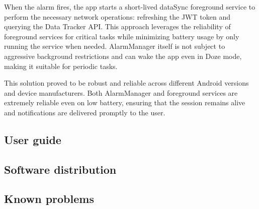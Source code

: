 When the alarm fires, the app starts a short-lived dataSync foreground service to perform the necessary network operations: refreshing the JWT token and querying the Data Tracker API. This approach leverages the reliability of foreground services for critical tasks while minimizing battery usage by only running the service when needed. AlarmManager itself is not subject to aggressive background restrictions and can wake the app even in Doze mode, making it suitable for periodic tasks.

This solution proved to be robust and reliable across different Android versions and device manufacturers. Both AlarmManager and foreground services are extremely reliable even on low battery, ensuring that the session remains alive and notifications are delivered promptly to the user.






\subsection{User guide}
\subsection{Software distribution}
\subsection{Known problems}
